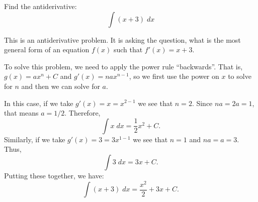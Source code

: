 \documentclass{ximera}
\author{Emma Smith Zbarsky}
\begin{document}
\begin{exercise}

Find the antiderivative: \[\int (x+3)\; dx\]


\begin{hint}
This is an antiderivative problem. It is asking the question, what is
the most general form of an equation $f(x)$ such that $f'(x) = x+3$.
\end{hint}


\begin{hint}
To solve this problem, we need to apply the power rule ``backwards''.
That is, $g(x) = ax^n+C$ and $g'(x) = nax^{n-1}$, so we first use the
power on $x$ to solve for $n$ and then we can solve for $a$.

In this case, if we take $g'(x) = x = x^{2-1}$ we see that $n=2$. Since
$na=2a=1$, that means $a=1/2$. Therefore,
\[\int x \; dx = \frac{1}{2}x^2+C.\] Similarly, if we take
$g'(x) = 3 = 3x^{1-1}$ we see that $n=1$ and $na = a = 3$. Thus,
\[\int 3\; dx = 3x+C.\] Putting these together, we have:
\[\int (x+3) \; dx = \frac{x^2}{2}+3x+C.\]
\end{hint}


\begin{multipleChoice}
\end{multipleChoice}

\end{exercise}
\end{document}
